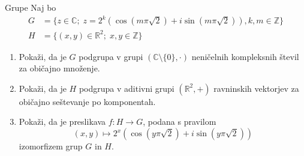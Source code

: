 \begin{frame}{Grupe}
	Naj bo
	\begin{align*}
		G &=\{z\in\mathbb{C};\;z=2^k(\cos(m\pi\sqrt{2})+i\sin(m\pi\sqrt{2})),k,m\in\mathbb{Z}\}\\
		H &=\{(x,y)\in\mathbb{R}^2;\;x,y\in\mathbb{Z}\}
	\end{align*}
	\begin{enumerate}
		\item
			Pokaži, da je $G$ podgrupa v grupi $(\mathbb{C}\setminus\{0\},\cdot)$
			neničelnih kompleksnih števil za običajno množenje.
		\item
			Pokaži, da je $H$ podgrupa v aditivni grupi $(\mathbb{R}^2,+)$ 
			ravninskih vektorjev za običajno seštevanje po komponentah.
		\item
			Pokaži, da je preslikava $f:H\to G$, podana s pravilom
			$$ (x,y)\mapsto 2^x(\cos(y\pi\sqrt{2})+i\sin(y\pi\sqrt{2}))$$
			izomorfizem grup $G$ in $H$.
	\end{enumerate}
\end{frame}
